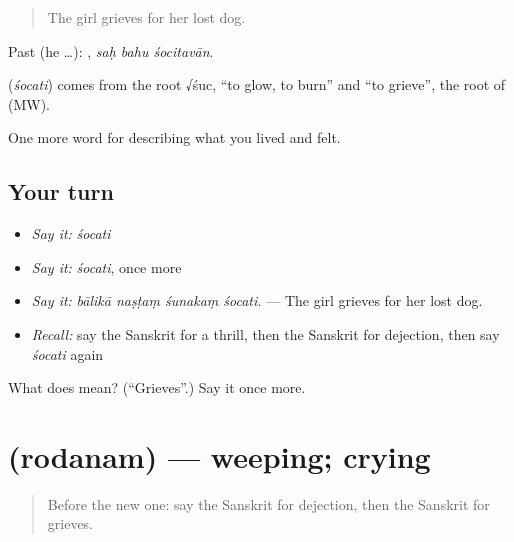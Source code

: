 \begin{quote}
The girl grieves for her lost dog.
\end{quote}

Past (he …):   , \emph{saḥ bahu śocitavān}.

\begin{cousinweb}
\textbf{} (\emph{śocati}) comes from the root √śuc, \textquotedblleft{}to glow, to burn\textquotedblright{} and \textquotedblleft{}to grieve\textquotedblright{}, the root of \textbf{} (MW).
\end{cousinweb}

\begin{grammarlens}[title={What you've built}]
One more word for describing what you lived and felt.
\end{grammarlens}

\subsection*{Your turn}
\begin{itemize}
\raggedright
  \item \emph{Say it:} \emph{śocati}
  \item \emph{Say it:} \emph{śocati}, once more
  \item \emph{Say it:} \emph{bālikā naṣṭaṃ śunakaṃ śocati.} — The girl grieves for her lost dog.
  \item \emph{Recall:} say the Sanskrit for a thrill, then the Sanskrit for dejection, then say \emph{śocati} again
\end{itemize}

\begin{tcolorbox}[breakable,colback=teal!4,colframe=teal!35!black,title={Before you move on}]
What does  mean? (\textquotedblleft{}Grieves\textquotedblright{}.) Say it once more.
\end{tcolorbox}
\section[\texorpdfstring{\sk{रोदनम्} (rodanam)}{रोदनम् (rodanam)}]{ (rodanam) — weeping; crying}

\label{lesson:SA-C450-rodanam}



\begin{quote}
Before the new one: say the Sanskrit for dejection, then the Sanskrit for grieves.
\end{quote}

